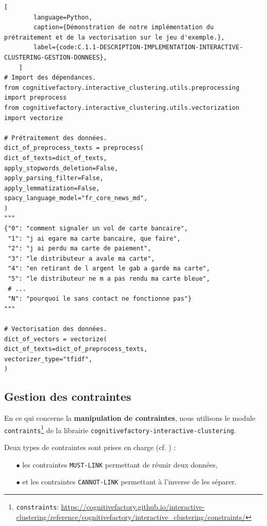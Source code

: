 	\begin{lstlisting}[
		language=Python,
		caption={Démonstration de notre implémentation du prétraitement et de la vectorisation sur le jeu d'exemple.},
		label={code:C.1.1-DESCRIPTION-IMPLEMENTATION-INTERACTIVE-CLUSTERING-GESTION-DONNEES},
	]
# Import des dépendances.
from cognitivefactory.interactive_clustering.utils.preprocessing import preprocess
from cognitivefactory.interactive_clustering.utils.vectorization import vectorize

# Prétraitement des données.
dict_of_preprocess_texts = preprocess(
dict_of_texts=dict_of_texts,
apply_stopwords_deletion=False,
apply_parsing_filter=False,
apply_lemmatization=False,
spacy_language_model="fr_core_news_md",
)
"""
{"0": "comment signaler un vol de carte bancaire",
 "1": "j ai egare ma carte bancaire, que faire",
 "2": "j ai perdu ma carte de paiement",
 "3": "le distributeur a avale ma carte",
 "4": "en retirant de l argent le gab a garde ma carte",
 "5": "le distributeur ne m a pas rendu ma carte bleue",
 # ...
 "N": "pourquoi le sans contact ne fonctionne pas"}
"""

# Vectorisation des données.
dict_of_vectors = vectorize(
dict_of_texts=dict_of_preprocess_texts,
vectorizer_type="tfidf",
)
	\end{lstlisting}
	
	\subsection{Gestion des contraintes}
	\label{section:C.1.2-DESCRIPTION-IMPLEMENTATION-INTERACTIVE-CLUSTERING-GESTION-DES-CONTRAINTES}
	
	En ce qui concerne la \textbf{manipulation de contraintes}, nous utilisons le module \texttt{contraints}\footnote{
		\texttt{constraints}: \url{https://cognitivefactory.github.io/interactive-clustering/reference/cognitivefactory/interactive_clustering/constraints/}
	} de la librairie \texttt{cognitivefactory-interactive-clustering}.
	
	Deux types de contraintes sont prises en charge (cf. \cite{wagstaff-cardie:2000:clustering-instancelevel-constraints}) :
	\begin{itemize}
		\item[\(\bullet\)] les contraintes \texttt{MUST-LINK} permettant de réunir deux données,
		\item[\(\bullet\)] et les contraintes \texttt{CANNOT-LINK} permettant à l'inverse de les séparer.
	\end{itemize}

